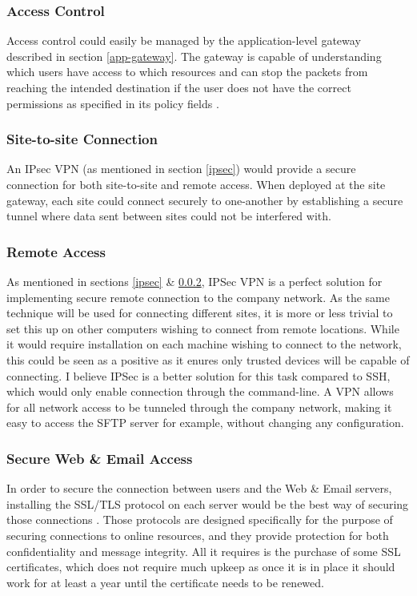 \documentclass[11pt]{article}
\begin{document}
        \subsubsection{Access Control}
          Access control could easily be managed by the application-level gateway described in section \ref{app-gateway}. The gateway is capable of understanding which users have access to which resources and can stop the packets from reaching the intended destination if the user does not have the correct permissions as specified in its policy fields \citep{openAppGateway}.

        \subsubsection{Site-to-site Connection} \label{ipsec2}
          An IPsec VPN (as mentioned in section \ref{ipsec}) would provide a secure connection for both site-to-site and remote access. When deployed at the site gateway, each site could connect securely to one-another by establishing a secure tunnel where data sent between sites could not be interfered with.

        \subsubsection{Remote Access}
          As mentioned in sections \ref{ipsec} \& \ref{ipsec2}, IPSec VPN is a perfect solution for implementing secure remote connection to the company network. As the same technique will be used for connecting different sites, it is more or less trivial to set this up on other computers wishing to connect from remote locations. While it would require installation on each machine wishing to connect to the network, this could be seen as a positive as it enures only trusted devices will be capable of connecting. I believe IPSec is a better solution for this task compared to SSH, which would only enable connection through the command-line. A VPN allows for all network access to be tunneled through the company network, making it easy to access the SFTP server for example, without changing any configuration.

        \subsubsection{Secure Web \& Email Access}
          In order to secure the connection between users and the Web \& Email servers, installing the SSL/TLS protocol on each server would be the best way of securing those connections \citep{ncsc2017tls}. Those protocols are designed specifically for the purpose of securing connections to online resources, and they provide protection for both confidentiality and message integrity. All it requires is the purchase of some SSL certificates, which does not require much upkeep as once it is in place it should work for at least a year until the certificate needs to be renewed.
\end{document}
